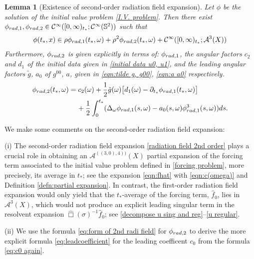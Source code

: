 \documentclass[10pt,a4paper,reqno]{amsart}
\newcommand{\CI}{\mathcal{C}^\infty}
\newcommand{\A}{\mathcal{A}}
\newcommand{\pa}{\partial}
\newcommand{\ti}{\tilde}
\renewcommand{\S}{{\mathbb S}}
\newtheorem{lemma}[theorem]{Lemma}
\theoremstyle{definition}
\theoremstyle{remark}
\numberwithin{equation}{section}
\newcommand{\ts}{t_*}
\newcommand{\wh}{\widehat}
\begin{document}
\begin{lemma}[Existence of second-order radiation field expansion]
	\label{lem:rad field small time}
	Let $\phi$ be the solution of the initial value problem \eqref{I.V. problem}. Then there exist $\phi_{\rm{rad},1}, \phi_{\rm{rad},2} \in \CI([0,\infty)_{t_*};\CI(\S^2))$ such that
	\begin{equation}
		\label{radiation field 2nd order}
		\phi(\ts,x) \in \rho\phi_{\rm{rad},1}(\ts,\omega) + \rho^2\phi_{\rm{rad},2}(\ts,\omega) + \CI([0,\infty)_{t_*}; \A^{3}(X))
	\end{equation}
Furthermore, $\phi_{\rm{rad},2}$ is given explicitly in terms of: $\phi_{\rm{rad},1}$, the angular factors $c_2$ and $d_1$ of the initial data given in \eqref{initial data u0, u1}, and the leading angular factors $\tilde g$, $a_0$ of $g^{00}$, $a$, given in \eqref{eqn:tilde g, g00}, \eqref{eqn:a a0} respectively.
 \begin{equation}
 \label{eq:form of 2nd radi field}
    \begin{split}
		\phi_{\rm{rad},2}(\ts,\omega) &= c_2(\omega) + \frac{1}{2}\ti g(\omega) \big[ d_1(\omega) - \pa_{\ts}\phi_{\rm{rad},1}(\ts,\omega) \big] \\ 
			&\quad\, + \frac{1}{2}\int_0^{\ts} (\Delta_\omega\phi_{\rm{rad},1}(s,\omega)-a_0(s,\omega)\phi_{\rm{rad},1}^3(s,\omega)) ds.
		\end{split}
	\end{equation} 
\end{lemma} 

We make some comments on the second-order radiation field expansion:

\noindent
(i) The second-order radiation field expansion \eqref{radiation field 2nd order} plays a crucial role in obtaining an $\A^{((3,0),4))}(X)$ partial expansion of the forcing term associated to the initial value problem defined in \eqref{forcing problem}, more precisely, its average in $\ts$; see the expansion \eqref{eqn:fhat} with \eqref{eqn:c(omega)} and Definition \ref{defn:partial expansion}. In contrast, the first-order radiation field expansion would only yield that the $\ts$-average of the forcing term, $\wh{f}_0$, lies in $\A^3(X)$, which would not produce an explicit leading singular term in the resolvent expansion $\wh\Box(\sigma)^{-1}\wh{f}_0$; see \eqref{decompose u sing and reg}--\eqref{u regular}.

\noindent
(ii) We use the formula \eqref{eq:form of 2nd radi field} for $\phi_{{\rm rad},2}$ to derive the more explicit formula \eqref{eq:leadcoefficient} for the leading coefficent $c_0$ from the formula \eqref{eq:c0 again}.
\end{document}
